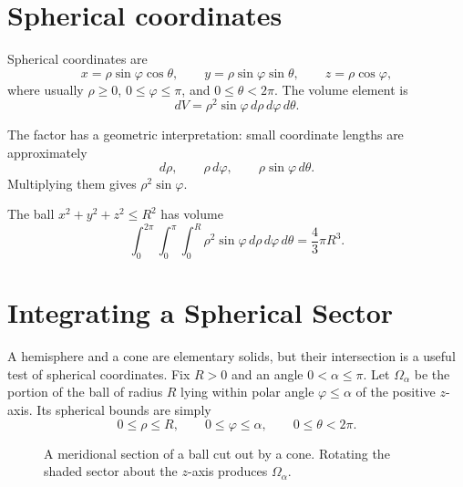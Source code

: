 \section{Spherical coordinates}

Spherical coordinates are
\[
  x=\rho\sin\varphi\cos\theta,\qquad
  y=\rho\sin\varphi\sin\theta,\qquad
  z=\rho\cos\varphi,
\]
where usually \(\rho\ge0\), \(0\le\varphi\le\pi\), and \(0\le\theta<2\pi\).  The volume element is
\[
  dV=\rho^2\sin\varphi\,d\rho\,d\varphi\,d\theta.
\]

The factor has a geometric interpretation: small coordinate lengths are approximately
\[
  d\rho,\qquad \rho\,d\varphi,\qquad \rho\sin\varphi\,d\theta.
\]
Multiplying them gives \(\rho^2\sin\varphi\).

\begin{example}
The ball \(x^2+y^2+z^2\le R^2\) has volume
\[
  \int_0^{2\pi}\int_0^{\pi}\int_0^R
  \rho^2\sin\varphi\,d\rho\,d\varphi\,d\theta
  =\frac{4}{3}\pi R^3.
\]
\end{example}

\section{Integrating a Spherical Sector}

A hemisphere and a cone are elementary solids, but their intersection is a useful test of spherical coordinates. Fix \(R>0\) and an angle \(0<\alpha\le\pi\). Let \(\Omega_\alpha\) be the portion of the ball of radius \(R\) lying within polar angle \(\varphi\le\alpha\) of the positive \(z\)-axis. Its spherical bounds are simply
\[
 0\le\rho\le R,\qquad
 0\le\varphi\le\alpha,\qquad
 0\le\theta<2\pi.
\]

\begin{figure}[H]
\centering
{}
\caption{A meridional section of a ball cut out by a cone. Rotating the shaded sector about the \(z\)-axis produces \(\Omega_\alpha\).}
\end{figure}

